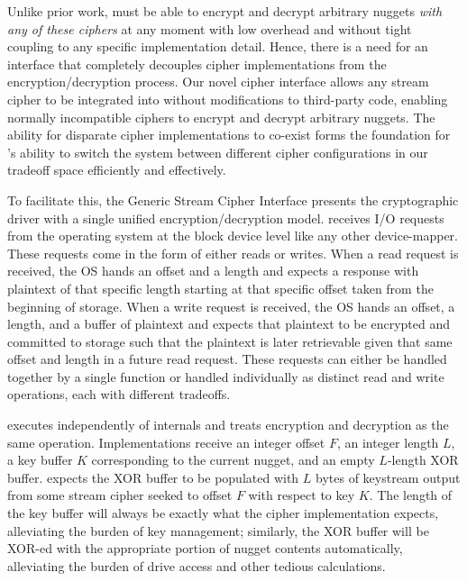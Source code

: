 
Unlike prior work, \sys must be able to encrypt and decrypt arbitrary nuggets
\emph{with any of these ciphers} at any moment with low overhead and without
tight coupling to any specific implementation detail. Hence, there is a need for
an interface that completely decouples cipher implementations from the
encryption/decryption process. Our novel cipher interface allows any stream
cipher to be integrated into \sys without modifications to third-party code,
enabling normally incompatible ciphers to encrypt and decrypt arbitrary nuggets.
The ability for disparate cipher implementations to co-exist forms the
foundation for \sys's ability to switch the system between different cipher
configurations in our tradeoff space efficiently and effectively.

To facilitate this, the Generic Stream Cipher Interface presents the
cryptographic driver with a single unified encryption/decryption model. \sys
receives I/O requests from the operating system at the block device level like
any other device-mapper. These requests come in the form of either reads or
writes. When a read request is received, the OS hands \sys an offset and a
length and expects a response with plaintext of that specific length starting at
that specific offset taken from the beginning of storage. When a write request
is received, the OS hands \sys an offset, a length, and a buffer of plaintext
and expects that plaintext to be encrypted and committed to storage such that
the plaintext is later retrievable given that same offset and length in a future
read request. These requests can either be handled together by a single function
or handled individually as distinct read and write operations, each with
different tradeoffs.


 executes independently of \sys internals and
treats encryption and decryption as the same operation. Implementations receive
an integer offset $F$, an integer length $L$, a key buffer $K$ corresponding to
the current nugget, and an empty $L$-length XOR buffer. \sys expects the XOR
buffer to be populated with $L$ bytes of keystream output from some stream
cipher seeked to offset $F$ with respect to key $K$. The length of the key
buffer will always be exactly what the cipher implementation expects,
alleviating the burden of key management; similarly, the XOR buffer will be
XOR-ed with the appropriate portion of nugget contents automatically,
alleviating the burden of drive access and other tedious calculations.

